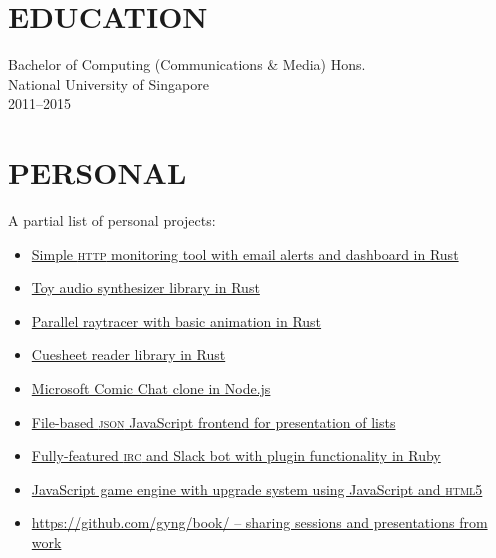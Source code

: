 \documentclass[line, margin]{res}
\begin{document}
\begin{resume}


    \section{EDUCATION}
        Bachelor of Computing (Communications \& Media) Hons. \\
        National University of Singapore \\
        2011--2015

    \section{PERSONAL}
        A partial list of personal projects:

        \begin{itemize}[leftmargin=*]
        \item \href{https://github.com/gyng/rcanary}{Simple \textsc{http} monitoring tool with email alerts and dashboard in Rust}
        \item \href{https://github.com/gyng/synthrs}{Toy audio synthesizer library in Rust}
        \item \href{https://github.com/gyng/rust-raytracer}{Parallel raytracer with basic animation in Rust}
        \item \href{https://github.com/gyng/rcue}{Cuesheet reader library in Rust}
        \item \href{https://github.com/gyng/comicchat/}{Microsoft Comic Chat clone in Node.js}
        \item \href{https://github.com/gyng/listoflists}{File-based \textsc{json} JavaScript frontend for presentation of lists}
        \item \href{https://github.com/gyng/betabot}{\textsc Fully-featured \textsc{irc} and Slack bot with plugin functionality in Ruby}
        \item \href{https://github.com/gyng/Asshault}{JavaScript game engine with upgrade system using JavaScript and \textsc{html5}}
        \item \href{https://github.com/gyng/book/}{https://github.com/gyng/book/ -- sharing sessions and presentations from work}
        \end{itemize}


\end{resume}
\end{document}
